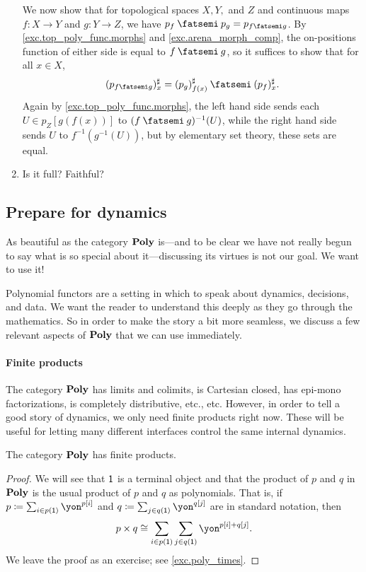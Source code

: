 \documentclass[Book-Poly]{subfiles}
\begin{document}
\begin{exercise}
\begin{solution}
\begin{enumerate}
	We now show that for topological spaces $X,Y,$ and $Z$ and continuous maps $f \colon X \to Y$ and $g \colon Y \to Z$, we have $p_f \then p_g = p_{f \then g}$.
	By \cref{exc.top_poly_func.morphs} and \cref{exc.arena_morph_comp}, the on-positions function of either side is equal to $f \then g$, so it suffices to show that for all $x \in X$,
	\[
	    (p_{f \then g})^\sharp_x = (p_g)^\sharp_{f(x)} \then (p_f)^\sharp_x.
	\]
	Again by \cref{exc.top_poly_func.morphs}, the left hand side sends each $U \in p_Z[g(f(x))]$ to $(f \then g)^{-1}(U)$, while the right hand side sends $U$ to $f^{-1}(g^{-1}(U))$, but by elementary set theory, these sets are equal.
	
	\item Is it full? Faithful?
\end{enumerate}
\end{solution}
\end{exercise}


\subsection{Prepare for dynamics}\label{subsec_prepare_dyn}

As beautiful as the category $\textbf{Poly}$ is---and to be clear we have not really begun to say what is so special about it---discussing its virtues is not our goal. We want to use it!

Polynomial functors are a setting in which to speak about dynamics, decisions, and data. We want the reader to understand this deeply as they go through the mathematics. So in order to make the story a bit more seamless, we discuss a few relevant aspects of $\textbf{Poly}$ that we can use immediately.


\paragraph{Finite products}
The category $\textbf{Poly}$ has limits and colimits, is Cartesian closed, has epi-mono factorizations, is completely distributive, etc., etc. However, in order to tell a good story of dynamics, we only need finite products right now. These will be useful for letting many different interfaces control the same internal dynamics.

\begin{proposition}\label{prop.poly_times}
The category $\textbf{Poly}$ has finite products. 
\end{proposition}
\begin{proof}
We will see that $\textsf{1}$ is a terminal object and that the product of $p$ and $q$ in $\textbf{Poly}$ is the usual product of $p$ and $q$ as polynomials. That is, if $p\coloneqq\sum_{i\in p(\1)}\yon^{p[i]}$ and $q\coloneqq\sum_{j\in q(\1)}\yon^{q[j]}$ are in standard notation, then
\begin{equation}\label{eqn.poly_times}
p\times q\cong\sum_{i\in p(\1)}\sum_{j\in q(\1)}\yon^{p[i]+q[j]}.
\end{equation}
We leave the proof as an exercise; see \cref{exc.poly_times}.
\end{proof}
\end{document}
